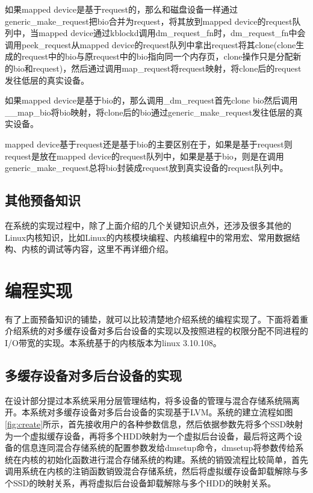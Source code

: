 如果mapped device是基于request的，那么和磁盘设备一样通过generic\_make\_request把bio合并为request，将其放到mapped device的request队列中，当mapped device通过kblockd调用dm\_request\_fn时，dm\_request\_fn中会调用peek\_request从mapped device的request队列中拿出request将其clone(clone生成的request中的bio与原request中的bio指向同一个内存页，clone操作只是分配新的bio和request)，然后通过调用map\_request将request映射，将clone后的request发往低层的真实设备。

如果mapped device是基于bio的，那么调用\_dm\_request首先clone bio然后调用\_\_map\_bio将bio映射，将clone后的bio通过generic\_make\_request发往低层的真实设备。

mapped device基于request还是基于bio的主要区别在于，如果是基于request则request是放在mapped device的request队列中，如果是基于bio，则是在调用generic\_make\_request总将bio封装成request放到真实设备的request队列中。


\subsection{其他预备知识}

在系统的实现过程中，除了上面介绍的几个关键知识点外，还涉及很多其他的Linux内核知识，比如Linux的内核模块编程、内核编程中的常用宏、常用数据结构、内核的调试等内容，这里不再详细介绍。

\section{编程实现}

有了上面预备知识的铺垫，就可以比较清楚地介绍系统的编程实现了。下面将着重介绍系统的对多缓存设备对多后台设备的实现以及按照进程的权限分配不同进程的I/O带宽的实现。本系统基于的内核版本为linux 3.10.108。

\subsection{多缓存设备对多后台设备的实现}

在设计部分提过本系统采用分层管理结构，将多设备的管理与混合存储系统隔离开。本系统对多缓存设备对多后台设备的实现基于LVM。系统的建立流程如图\ref{fig:create}所示，首先接收用户的各种参数信息，然后依据参数先将多个SSD映射为一个虚拟缓存设备，再将多个HDD映射为一个虚拟后台设备，最后将这两个设备的信息连同混合存储系统的配置参数发给dmsetup命令，dmsetup将参数传给系统在内核的初始化函数进行混合存储系统的构建。系统的销毁流程比较简单，首先调用系统在内核的注销函数销毁混合存储系统，然后将虚拟缓存设备卸载解除与多个SSD的映射关系，再将虚拟后台设备卸载解除与多个HDD的映射关系。


